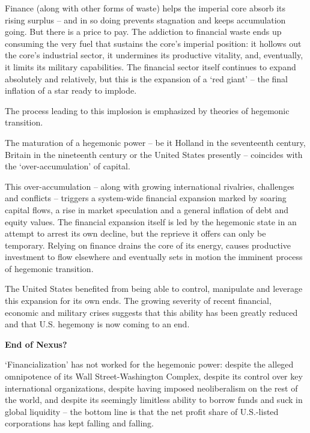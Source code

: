 \documentclass[
]{book}
\begin{document}
Finance (along with other
forms of waste) helps the imperial core absorb its rising surplus -- and in so doing
prevents stagnation and keeps accumulation going. But there is a price to pay. The
addiction to financial waste ends up consuming the very fuel that sustains the core's
imperial position: it hollows out the core's industrial sector, it undermines its productive
vitality, and, eventually, it limits its military capabilities. The financial sector itself
continues to expand absolutely and relatively, but this is the expansion of a `red giant' --
the final inflation of a star ready to implode.

The process leading to this implosion is emphasized by theories of hegemonic
transition.

The maturation of a hegemonic power -- be it Holland in the
seventeenth century, Britain in the nineteenth century or the United States presently --
coincides with the `over-accumulation' of capital.

This over-accumulation -- along with growing international rivalries,
challenges and conflicts -- triggers a system-wide financial expansion marked by soaring
capital flows, a rise in market speculation and a general inflation of debt and equity
values.
The financial expansion itself is led by the hegemonic state in an attempt to
arrest its own decline, but the reprieve it offers can only be temporary. Relying on finance
drains the core of its energy, causes productive investment to flow elsewhere and
eventually sets in motion the imminent process of hegemonic transition.

The United States benefited from being able to control,
manipulate and leverage this expansion for its own ends.
The growing severity of recent financial, economic and military crises suggests
that this ability has been greatly reduced and that U.S. hegemony is now coming to an end.

\textbf{End of Nexus?}

`Financialization' has not worked for the hegemonic power: despite the alleged
omnipotence of its Wall Street-Washington Complex, despite its control over key
international organizations, despite having imposed neoliberalism on the rest of the
world, and despite its seemingly limitless ability to borrow funds and suck in global
liquidity -- the bottom line is that the net profit share of U.S.-listed corporations has kept
falling and falling.
\end{document}
